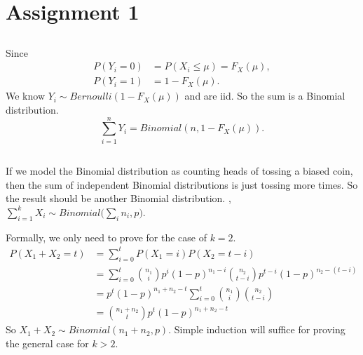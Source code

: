 \section{Assignment 1}

\subsection{} %

Since
\begin{align}
    P(Y_i=0) &= P(X_i\le\mu) = F_X(\mu), \\
    P(Y_i=1) &= 1 - F_X(\mu).
\end{align}
We know $Y_i\sim Bernoulli(1-F_X(\mu))$ and are iid.
So the sum is a Binomial distribution. \ie
\begin{equation}
    \sum_{i=1}^n Y_i = Binomial(n, 1 - F_X(\mu)).
\end{equation}


\subsection{} %

If we model the Binomial distribution as counting heads of tossing a biased coin,
then the sum of independent Binomial distributions is just tossing more times.
So the result should be another Binomial distribution.
\ie, $\sum_{i=1}^{k}X_i \sim Binomial\big(\sum_i n_i, p\big)$.

Formally, we only need to prove for the case of $k=2$.
\begin{align}
    P(X_1+X_2=t) &= \sum_{i=0}^t P(X_1=i)P(X_2=t-i) \\
                 &= \sum_{i=0}^t \binom{n_1}{i}p^{i}(1-p)^{n_1-i}\binom{n_2}{t-i}p^{t-i}(1-p)^{n_2-(t-i)} \\
                 &= p^{t}(1-p)^{n_1+n_2-t}\sum_{i=0}^t \binom{n_1}{i}\binom{n_2}{t-i} \\
                 &= \binom{n_1+n_2}{t}p^{t}(1-p)^{n_1+n_2-t}
\end{align}
So $X_1+X_2\sim Binomial(n_1+n_2, p)$.
Simple induction will suffice for proving the general case for $k>2$.


\subsection{} %

